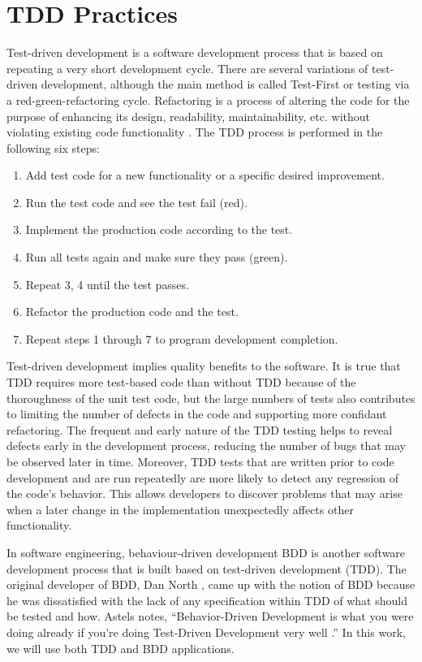 \documentclass[conference]{IEEEtran}
\newcommand{\squishlist}{
 \begin{list}{$\bullet$}
  { \setlength{\itemsep}{0pt}
     \setlength{\parsep}{3pt}
     \setlength{\topsep}{3pt}
     \setlength{\partopsep}{0pt}
     \setlength{\leftmargin}{1.5em}
     \setlength{\labelwidth}{1em}
     \setlength{\labelsep}{0.5em} } }
\newcommand{\squishend}{
  \end{list}  }
\begin{document}
\section{TDD Practices}\label{sec:TDDPractices}
Test-driven development is a software development process that is based on repeating a very short development cycle. There are several variations of test-driven development, although the main method is called Test-First or testing via a red-green-refactoring cycle. Refactoring is a process of altering the code for the purpose of enhancing its design, readability, maintainability, etc. without violating existing code functionality \cite{fowler1999refactoring}. %
The TDD process is performed in the following six steps:
\begin{enumerate}
\item Add test code for a new functionality or a specific desired improvement.
\item Run the test code and see the test fail (red).
\item Implement the production code according to the test.
\item Run all tests again and make sure they pass (green).
\item Repeat 3, 4 until the test passes.
\item Refactor the production code and the test.
\item Repeat steps 1 through 7 to program development completion.
\end{enumerate}

Test-driven development implies quality benefits to the software. It is true that TDD requires more test-based code than without TDD because of the thoroughness of the unit test code, but the large numbers of tests also contributes to limiting the number of defects in the code and supporting more confidant refactoring. The frequent and early nature of the TDD testing helps to reveal defects early in the development process, reducing the number of bugs that may be observed later in time. Moreover, TDD tests that are written prior to code development and are run repeatedly are more likely to detect any regression of the code's behavior. This allows developers to discover problems that may arise when a later change in the implementation unexpectedly affects other functionality.

In software engineering, behaviour-driven development BDD is another software development process that is built based on test-driven development (TDD). The original developer of BDD, Dan North \cite{north2006introducing}, came up with the notion of BDD because he was dissatisfied with the lack of any specification within TDD of what should be tested and how. Astels notes, ``Behavior-Driven Development is what you were doing already if you're doing Test-Driven Development very well \cite{Astels2006Beyond}.''  In this work, we will use both TDD and BDD applications.
\end{document}
